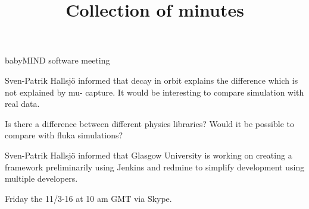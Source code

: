 \documentclass{article}
\title{Collection of minutes}
\author{\LaTeXe}
\begin{document}
\begin{Minutes}{babyMIND software meeting}
\maketitle

Sven-Patrik Hallsj\"o  informed that decay in orbit explains the difference which is not explained by mu- capture.
It would be interesting to compare simulation with real data.

Is there a difference between different physics libraries?
Would it be possible to compare with fluka simulations?



Sven-Patrik Hallsj\"o informed that Glasgow University is working on creating a framework preliminarily using Jenkins and redmine to simplify development using multiple developers. 

Friday the 11/3-16 at 10 am GMT via Skype.

\end{Minutes}
\end{document}
